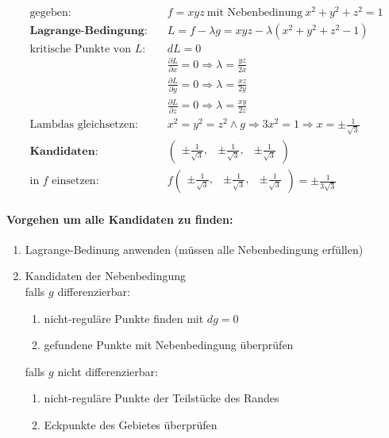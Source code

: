 \documentclass[11pt]{article}
\begin{document}
\begin{equation*}
\begin{split}
	\text{gegeben:} \quad & f = xyz\ \text{mit Nebenbedinung}\ x^2 + y^2 + z^2 = 1 \\
	\textbf{Lagrange-Bedingung:} \quad & L = f - \lambda g = xyz - \lambda(x^2 + y^2 + z^2 - 1) \\
	\text{kritische Punkte von $L$:} \quad & dL = 0 \\
	& \frac{\partial L}{\partial x} = 0 \Rightarrow \lambda = \frac{yz}{2x} \\
	& \frac{\partial L}{\partial y} = 0 \Rightarrow \lambda = \frac{xz}{2y} \\
	& \frac{\partial L}{\partial z} = 0 \Rightarrow \lambda = \frac{xy}{2z} \\
	\text{Lambdas gleichsetzen:} \quad & x^2 = y^2 = z^2 \land g \Rightarrow 3x^2 = 1 \Rightarrow x = \pm \frac{1}{\sqrt{3}} \\
	\textbf{Kandidaten:} \quad & \begin{pmatrix}
		\pm \frac{1}{\sqrt{3}}, & \pm \frac{1}{\sqrt{3}}, & \pm \frac{1}{\sqrt{3}}
	\end{pmatrix} \\
	\text{in $f$ einsetzen:} \quad & f\begin{pmatrix}
		\pm \frac{1}{\sqrt{3}}, & \pm \frac{1}{\sqrt{3}}, & \pm \frac{1}{\sqrt{3}}
	\end{pmatrix} = \pm \frac{1}{3\sqrt{3}}
\end{split}
\end{equation*}

\paragraph{Vorgehen um alle Kandidaten zu finden:}
\begin{enumerate}[noitemsep]
	\item Lagrange-Bedinung anwenden (müssen alle Nebenbedingung erfüllen)
	\item Kandidaten der Nebenbedingung \\
	falls $g$ differenzierbar: 
	\begin{enumerate}[noitemsep]
		\item nicht-reguläre Punkte finden mit $dg = 0$
		\item gefundene Punkte mit Nebenbedingung überprüfen
	\end{enumerate}
	falls $g$ nicht differenzierbar:
	\begin{enumerate}[noitemsep]
		\item nicht-reguläre Punkte der Teilstücke des Randes
		\item Eckpunkte des Gebietes überprüfen
	\end{enumerate}
\end{enumerate}
\end{document}
